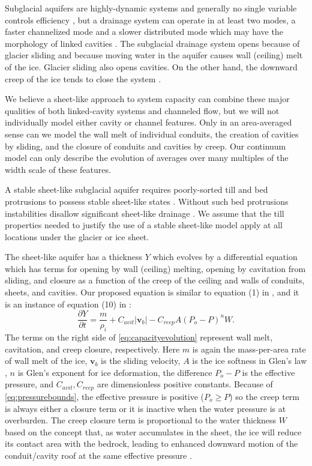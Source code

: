 \documentclass[11pt]{amsart}
\newcommand{\bv}{\mathbf{v}}
\newcommand{\Cavit}{C_{avit}}
\newcommand{\Creep}{C_{reep}}
\begin{document}
Subglacial aquifers are highly-dynamic systems and generally no single variable controls efficiency \citep[e.g.][]{Bartholomausetal2008}, but a drainage system can operate in at least two modes, a faster channelized mode and a slower distributed mode which may have the morphology of linked cavities \citep{Schoofmeltsupply}.  The subglacial drainage system opens because of glacier sliding and because moving water in the aquifer causes wall (ceiling) melt of the ice.  Glacier sliding also opens cavities.  On the other hand,  the downward creep of the ice tends to close the system \citep{Hewitt2011,Walder1982}.

We believe a sheet-like approach to system capacity can combine these major qualities of both linked-cavity systems and channeled flow, but we will not individually model either cavity or channel features.  Only in an area-averaged sense can we model the wall melt of individual conduits, the creation of cavities by sliding, and the closure of conduits and cavities by creep.  Our continuum model can only describe the evolution of averages over many multiples of the width scale of these features.

A stable sheet-like subglacial aquifer requires poorly-sorted till and bed protrusions to possess stable sheet-like states \citep{CreytsSchoof2009}.  Without such bed protrusions instabilities disallow significant sheet-like drainage \citep{Walder1982}.  We assume that the till properties needed to justify the use of a stable sheet-like model apply at all locations under the glacier or ice sheet.

The sheet-like aquifer has a thickness $Y$ which evolves by a differential equation which has terms for opening by wall (ceiling) melting, opening by cavitation from sliding, and closure as a function of the creep of the ceiling and walls of conduits, sheets, and cavities.  Our proposed equation is similar to equation (1) in \citet{Schoofmeltsupply}, and it is an instance of equation (10) in \citet{Hewitt2011}:
\begin{equation} \label{eq:capacityevolution}
\frac{\partial Y}{\partial t} = \frac{m}{\rho_i} + \Cavit |\bv_b| - \Creep A (P_o - P)^n W.
\end{equation}
The terms on the right side of \eqref{eq:capacityevolution} represent wall melt, cavitation, and creep closure, respectively.  Here $m$ is again the mass-per-area rate of wall melt of the ice, $\bv_b$ is the sliding velocity, $A$ is the ice softness in Glen's law \citep{Paterson}, $n$ is Glen's exponent for ice deformation, the difference $P_o-P$ is the effective pressure, and $\Cavit,\Creep$ are dimensionless positive constants.  Because of \eqref{eq:pressurebounds}, the effective pressure is positive ($P_o \ge P$) so the creep term is always either a closure term or it is inactive when the water pressure is at overburden.  The creep closure term is proportional to the water thickness $W$ based on the concept that, as water accumulates in the sheet, the ice will reduce its contact area with the bedrock, leading to enhanced downward motion of the conduit/cavity roof at the same effective pressure \citep{Hewitt2011}.
\end{document}
